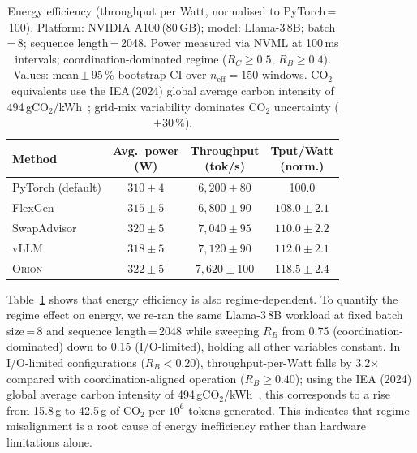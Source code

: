 \begin{table}[t]
\centering
\caption{Energy efficiency (throughput per Watt, normalised to PyTorch\,=\,100).
         Platform: NVIDIA A100\,(80\,GB); model: Llama-3\,8B; batch\,=\,8;
         sequence length\,=\,2048.
         Power measured via NVML at 100\,ms intervals; coordination-dominated
         regime ($R_C \geq 0.5$, $R_B \geq 0.4$).
         Values: mean\,$\pm$\,95\,\% bootstrap CI over
         $n_{\mathrm{eff}}\!=\!150$ windows.
         CO$_2$ equivalents use the IEA\,(2024) global average carbon
         intensity of 494\,gCO$_2$/kWh~\cite{iea2024electricity};
         grid-mix variability dominates CO$_2$ uncertainty ($\pm$30\,\%).}
\label{tab:energy}
\renewcommand{\arraystretch}{1.2}
\footnotesize
\begin{tabular}{lccc}
\toprule
\textbf{Method} &
  \makecell{\textbf{Avg.\ power}\\\textbf{(W)}} &
  \makecell{\textbf{Throughput}\\\textbf{(tok/s)}} &
  \makecell{\textbf{Tput/Watt}\\\textbf{(norm.)}} \\
\midrule
PyTorch (default)                       & $310 \pm 4$ & $6{,}200 \pm 80$ & 100.0 \\
FlexGen~\cite{flexgen2023}              & $315 \pm 5$ & $6{,}800 \pm 90$ & $108.0 \pm 2.1$ \\
SwapAdvisor~\cite{huang2020swapadvisor} & $320 \pm 5$ & $7{,}040 \pm 95$ & $110.0 \pm 2.2$ \\
vLLM~\cite{kwon2023pagedattention}      & $318 \pm 5$ & $7{,}120 \pm 90$ & $112.0 \pm 2.1$ \\
\textsc{Orion}                          & $322 \pm 5$ & $7{,}620 \pm 100$ & $118.5 \pm 2.4$ \\
\bottomrule
\end{tabular}
\end{table}

Table~\ref{tab:energy} shows that energy efficiency is also regime-dependent.
To quantify the regime effect on energy, we re-ran the same Llama-3\,8B workload
at fixed batch size\,=\,8 and sequence length\,=\,2048 while sweeping $R_B$ from
0.75 (coordination-dominated) down to 0.15 (I/O-limited), holding all other
variables constant.
In I/O-limited configurations ($R_B < 0.20$), throughput-per-Watt falls by
3.2$\times$ compared with coordination-aligned operation ($R_B \geq 0.40$);
using the IEA (2024) global average carbon intensity of
494\,gCO$_2$/kWh~\cite{iea2024electricity}, this corresponds to a rise
from 15.8\,g to 42.5\,g of CO$_2$ per $10^6$ tokens generated.
This indicates that regime misalignment is a root cause of energy inefficiency
rather than hardware limitations alone.

\FloatBarrier
